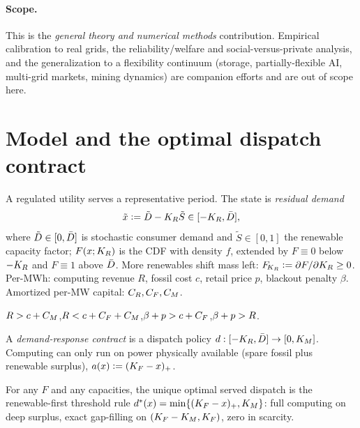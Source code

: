 \paragraph{Scope.} This is the \emph{general theory and numerical methods}
contribution. Empirical calibration to real grids, the reliability/welfare and
social-versus-private analysis, and the generalization to a flexibility continuum
(storage, partially-flexible AI, multi-grid markets, mining dynamics) are
companion efforts and are out of scope here.

\section{Model and the optimal dispatch contract}\label{intg-sec:model}

A regulated utility serves a representative period. The state is \emph{residual
demand}
\begin{equation}\label{intg-eq:resdem}
  \tilde x \vcentcolon= \tilde D - K_R\tilde S \in[-K_R,\bar D],
\end{equation}
where $\tilde D\in[0,\bar D]$ is stochastic consumer demand and $\tilde S\in[0,1]$
the renewable capacity factor; $F(x;K_R)$ is the CDF with density $f$, extended by
$F\equiv0$ below $-K_R$ and $F\equiv1$ above $\bar D$. More renewables shift mass
left: $F_{\!K_R}\vcentcolon=\partial F/\partial K_R\ge0$. Per-MWh: computing revenue $R$,
fossil cost $c$, retail price $p$, blackout penalty $\beta$. Amortized per-MW
capital: $C_R,C_F,C_M$.

\begin{assumption}\label{intg-ass:reg}
$R>c+C_M$,\quad $R<c+C_F+C_M$,\quad $\beta+p>c+C_F$,\quad $\beta+p>R$.
\end{assumption}

\noindent A \emph{demand-response contract} is a dispatch policy
$d:[-K_R,\bar D]\to[0,K_M]$. Computing can only run on power physically available
(spare fossil plus renewable surplus), $a(x)\vcentcolon=(K_F-x)_+$.

\begin{lemma}\label{intg-lem:dispatch}
For any $F$ and any capacities, the unique optimal served dispatch is the
renewable-first threshold rule
$d^{*}(x)=\min\{(K_F-x)_+,K_M\}$: full computing on deep surplus, exact
gap-filling on $(K_F-K_M,K_F)$, zero in scarcity.
\end{lemma}

